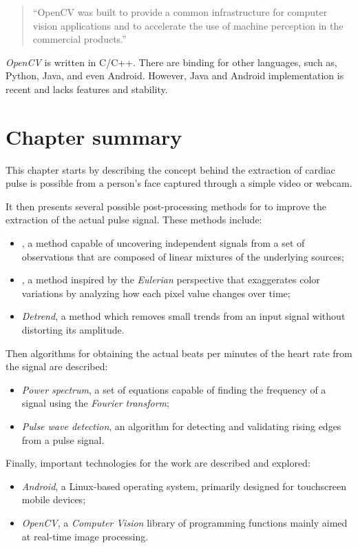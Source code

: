 \begin{quote}
  ``OpenCV was built to provide a common infrastructure for computer
  vision applications and to accelerate the use of machine perception
  in the commercial products.''~\cite{Opencv2013About}
\end{quote}

\emph{OpenCV} is written in C/C++. There are binding for other languages,
such as, Python, Java, and even Android. However, Java and Android
implementation is recent and lacks features and stability.

\section{Chapter summary}

This chapter starts by describing the concept behind the extraction of
cardiac pulse is possible from a person's face captured through a simple video
or webcam.

It then presents several possible post-processing methods for to improve
the extraction of the actual pulse signal. These methods include:
\begin{itemize}
  \item \emph{\ica}, a method capable of uncovering independent signals from
        a set of observations that are composed of linear mixtures of the
        underlying sources;
  \item \emph{\evm}, a method inspired by the \emph{Eulerian} perspective that
        exaggerates color variations by analyzing how each pixel value
        changes over time;
  \item \emph{Detrend}, a method which removes small trends from an input
        signal without distorting its amplitude.
\end{itemize}

Then algorithms for obtaining the actual beats per minutes of the heart rate
from the signal are described:
\begin{itemize}
  \item \emph{Power spectrum}, a set of equations capable of finding the
        frequency of a signal using the \emph{Fourier transform};
  \item \emph{Pulse wave detection}, an algorithm for detecting and validating
        rising edges from a pulse signal.
\end{itemize}

Finally, important technologies for the work are described and explored:
\begin{itemize}
  \item \emph{Android}, a Linux-based operating system, primarily designed for
        touchscreen mobile devices;
  \item \emph{OpenCV}, a \emph{Computer Vision} library of programming
        functions mainly aimed at real-time image processing.
\end{itemize}
